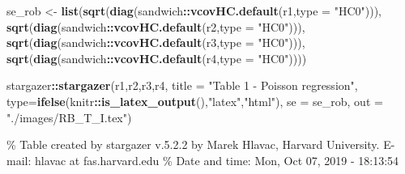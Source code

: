 \documentclass[]{book}
\newenvironment{Shaded}{\begin{snugshade}}{\end{snugshade}}
\newcommand{\KeywordTok}[1]{\textcolor[rgb]{0.13,0.29,0.53}{\textbf{#1}}}
\newcommand{\DataTypeTok}[1]{\textcolor[rgb]{0.13,0.29,0.53}{#1}}
\newcommand{\StringTok}[1]{\textcolor[rgb]{0.31,0.60,0.02}{#1}}
\newcommand{\OperatorTok}[1]{\textcolor[rgb]{0.81,0.36,0.00}{\textbf{#1}}}
\newcommand{\NormalTok}[1]{#1}
\begin{document}
\begin{Shaded}
\begin{Highlighting}[]
\NormalTok{se_rob <-}\StringTok{ }\KeywordTok{list}\NormalTok{(}\KeywordTok{sqrt}\NormalTok{(}\KeywordTok{diag}\NormalTok{(sandwich}\OperatorTok{::}\KeywordTok{vcovHC.default}\NormalTok{(r1,}\DataTypeTok{type =} \StringTok{"HC0"}\NormalTok{))),}
               \KeywordTok{sqrt}\NormalTok{(}\KeywordTok{diag}\NormalTok{(sandwich}\OperatorTok{::}\KeywordTok{vcovHC.default}\NormalTok{(r2,}\DataTypeTok{type =} \StringTok{"HC0"}\NormalTok{))),}
               \KeywordTok{sqrt}\NormalTok{(}\KeywordTok{diag}\NormalTok{(sandwich}\OperatorTok{::}\KeywordTok{vcovHC.default}\NormalTok{(r3,}\DataTypeTok{type =} \StringTok{"HC0"}\NormalTok{))),}
               \KeywordTok{sqrt}\NormalTok{(}\KeywordTok{diag}\NormalTok{(sandwich}\OperatorTok{::}\KeywordTok{vcovHC.default}\NormalTok{(r4,}\DataTypeTok{type =} \StringTok{"HC0"}\NormalTok{))))}
\end{Highlighting}
\end{Shaded}

\begin{Shaded}
\begin{Highlighting}[]
\NormalTok{stargazer}\OperatorTok{::}\KeywordTok{stargazer}\NormalTok{(r1,r2,r3,r4, }\DataTypeTok{title =} \StringTok{"Table 1 - Poisson regression"}\NormalTok{, }
          \DataTypeTok{type=}\KeywordTok{ifelse}\NormalTok{(knitr}\OperatorTok{::}\KeywordTok{is_latex_output}\NormalTok{(),}\StringTok{"latex"}\NormalTok{,}\StringTok{"html"}\NormalTok{), }\DataTypeTok{se =}\NormalTok{ se_rob, }\DataTypeTok{out =} \StringTok{"./images/RB_T_I.tex"}\NormalTok{)}
\end{Highlighting}
\end{Shaded}

\% Table created by stargazer v.5.2.2 by Marek Hlavac, Harvard
University. E-mail: hlavac at fas.harvard.edu \% Date and time: Mon, Oct
07, 2019 - 18:13:54
\end{document}

